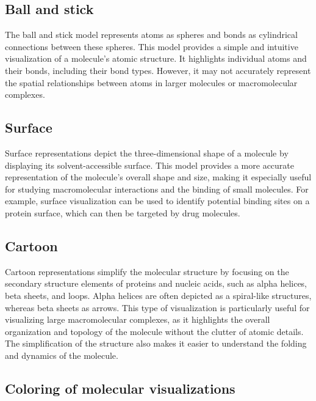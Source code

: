 \documentclass[
  digital,     %
  oneside,     %
  nosansbold,  %
  nocolorbold, %
  lof,         %
  lot,         %
]{fithesis4}
\begin{document}
\subsection{Ball and stick}
\label{subsection:ball_and_stick}

The ball and stick model represents atoms as spheres and bonds as cylindrical connections between these spheres. This model provides a simple and intuitive visualization of a molecule's atomic structure. It highlights individual atoms and their bonds, including their bond types. However, it may not accurately represent the spatial relationships between atoms in larger molecules or macromolecular complexes.

\subsection{Surface}
\label{subsection:surface}

Surface representations depict the three-dimensional shape of a molecule by displaying its solvent-accessible surface.
This model provides a more accurate representation of the molecule's overall shape and size, making it especially useful for studying macromolecular interactions and the binding of small molecules.
For example, surface visualization can be used to identify potential binding sites on a protein surface, which can then be targeted by drug molecules.

\subsection{Cartoon}
\label{subsection:cartoon}

Cartoon representations simplify the molecular structure by focusing on the secondary structure elements of proteins and nucleic acids, such as alpha helices, beta sheets, and loops. Alpha helices are often depicted as a spiral-like structures, whereas beta sheets as arrows. This type of visualization is particularly useful for visualizing large macromolecular complexes, as it highlights the overall organization and topology of the molecule without the clutter of atomic details. The simplification of the structure also makes it easier to understand the folding and dynamics of the molecule.

\subsection{Coloring of molecular visualizations}
\label{subsection:coloring_of_molecular_visualizations}
\end{document}
